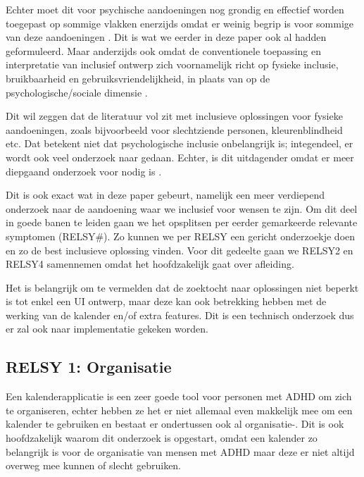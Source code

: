 Echter moet dit voor psychische aandoeningen nog grondig en effectief worden toegepast op sommige vlakken enerzijds omdat er weinig begrip is voor sommige van deze aandoeningen \autocite{yonghun2015inclusive}. Dit is wat we eerder in deze paper ook al hadden geformuleerd. Maar anderzijds ook omdat de conventionele toepassing en interpretatie van inclusief ontwerp zich voornamelijk richt op fysieke inclusie, bruikbaarheid en gebruiksvriendelijkheid, in plaats van op de psychologische/sociale dimensie \autocite{yonghun2015inclusive}. \newline

Dit wil zeggen dat de literatuur vol zit met inclusieve oplossingen voor fysieke aandoeningen, zoals bijvoorbeeld voor slechtziende personen, kleurenblindheid etc. Dat betekent niet dat psychologische inclusie onbelangrijk is; integendeel, er wordt ook veel onderzoek naar gedaan. Echter, is dit uitdagender omdat er meer diepgaand onderzoek voor nodig is \autocite{yonghun2015inclusive}.  \newline

Dit is ook exact wat in deze paper gebeurt, namelijk een meer verdiepend onderzoek naar de aandoening waar we inclusief voor wensen te zijn. 
Om dit deel in goede banen te leiden gaan we het opsplitsen per eerder gemarkeerde relevante symptomen (RELSY#). Zo kunnen we per RELSY een gericht onderzoekje doen en zo de best inclusieve oplossing vinden. Voor dit gedeelte gaan we RELSY2 en RELSY4 samennemen omdat het hoofdzakelijk gaat over afleiding. \newline

Het is belangrijk om te vermelden dat de zoektocht naar oplossingen niet beperkt is tot enkel een UI ontwerp, maar deze kan ook betrekking hebben met de werking van de kalender en/of extra features. Dit is een technisch onderzoek dus er zal ook naar implementatie gekeken worden.

\subsection{RELSY 1: Organisatie}
Een kalenderapplicatie is een zeer goede tool voor personen met ADHD om zich te organiseren, echter hebben ze het er niet allemaal even makkelijk mee om een kalender te gebruiken en bestaat er ondertussen ook al organisatie-\autocite{langberg2008organizational}. Dit is ook hoofdzakelijk waarom dit onderzoek is opgestart, omdat een kalender zo belangrijk is voor de organisatie van mensen met ADHD maar deze er niet altijd overweg mee kunnen of slecht gebruiken. \newline

